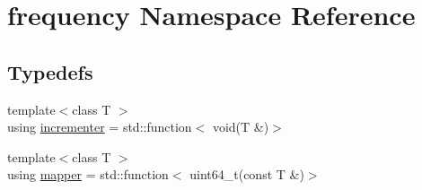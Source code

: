 \hypertarget{namespacefrequency}{}\section{frequency Namespace Reference}
\label{namespacefrequency}
\subsection*{Typedefs}
\begin{DoxyCompactItemize}
\item 
{\footnotesize template$<$class T $>$ }\\using \hyperlink{namespacefrequency_af87bfdb87aeaf4b03b24c0632e9f0285}{incrementer} = std\+::function$<$ void(T \&)$>$
\item 
{\footnotesize template$<$class T $>$ }\\using \hyperlink{namespacefrequency_aa17c006bff1dce09290290eb7e5e6acf}{mapper} = std\+::function$<$ uint64\+\_\+t(const T \&)$>$
\end{DoxyCompactItemize}
